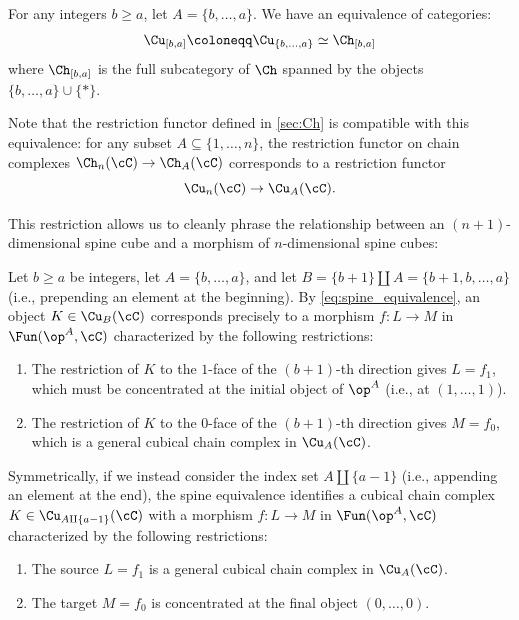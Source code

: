 \begin{claim}
For any integers $b \geq a$, let $A = \{b, \dots, a\}$. We have an equivalence of categories:
\[
    \Cu_{[b,a]} \coloneqq \Cu_{\{b, \dots, a\}} \simeq \Ch_{[b,a]}
\]
where $\Ch_{[b,a]}$ is the full subcategory of $\Ch$ spanned by the objects $\{b,\dots , a\} \cup \{\ast\}$.
\end{claim}

Note that the restriction functor defined in \cref{sec:Ch} is compatible with this equivalence: for any subset $A \subseteq \{1, \dots, n\}$, the restriction functor on chain complexes $\Ch_n(\cC) \to \Ch_A(\cC)$ corresponds to a restriction functor
\begin{equation*}
    \Cu_n(\cC) \to \Cu_A(\cC).
\end{equation*}

This restriction allows us to cleanly phrase the relationship between an $(n+1)$-dimensional spine cube and a morphism of $n$-dimensional spine cubes:

\begin{lem}\label{lem:morphism_to_cube}
Let $b \geq a$ be integers, let $A = \{b, \dots, a\}$, and let $B = \{b+1\} \amalg A = \{b+1, b, \dots, a\}$ (i.e., prepending an element at the beginning).
By \cref{eq:spine_equivalence}, an object $K \in \Cu_B(\cC)$ corresponds precisely to a morphism $f \colon L \to M$ in $\Fun(\op^A, \cC)$ characterized by the following restrictions:
\begin{enumerate}
    \item The restriction of $K$ to the $1$-face of the $(b+1)$-th direction gives $L = f_1$, which must be concentrated at the initial object of $\op^A$ (i.e., at $(1, \dots, 1)$).
    \item The restriction of $K$ to the $0$-face of the $(b+1)$-th direction gives $M = f_0$, which is a general cubical chain complex in $\Cu_A(\cC)$.
\end{enumerate}
\end{lem}

\begin{rem}\label{rem:morphism_to_cube_append}
Symmetrically, if we instead consider the index set $A \amalg \{a-1\}$ (i.e., appending an element at the end), the spine equivalence identifies a cubical chain complex $K \in \Cu_{A \amalg \{a-1\}}(\cC)$ with a morphism $f \colon L \to M$ in $\Fun(\op^{A}, \cC)$ characterized by the following restrictions:
\begin{enumerate}
    \item The source $L = f_1$ is a general cubical chain complex in $\Cu_{A}(\cC)$.
    \item The target $M = f_0$ is concentrated at the final object $(0, \dots, 0)$.
\end{enumerate}
\end{rem}

